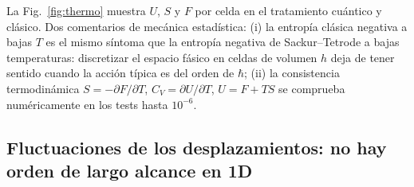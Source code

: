 \documentclass[11pt,a4paper]{article}
\begin{document}
La Fig.~\ref{fig:thermo} muestra $U$, $S$ y $F$ por celda en el tratamiento
cuántico y clásico. Dos comentarios de mecánica estadística:
(i) la entropía clásica negativa a bajas $T$ es el mismo síntoma que la
entropía negativa de Sackur–Tetrode a bajas temperaturas: discretizar el
espacio fásico en celdas de volumen $h$ deja de tener sentido cuando la acción
típica es del orden de $\hbar$; (ii) la consistencia termodinámica
$S=-\partial F/\partial T$, $C_V=\partial U/\partial T$, $U=F+TS$ se comprueba
numéricamente en los tests hasta $10^{-6}$.

\subsection{Fluctuaciones de los desplazamientos: no hay orden de largo alcance en 1D}
\end{document}
